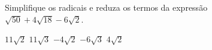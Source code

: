 Simplifique os radicais e reduza os termos da expressão\\$\sqrt{50}+4\sqrt{18}-6\sqrt{2}$.

$11\sqrt{2}$
$11\sqrt{3}$
$-4\sqrt{2}$
$-6\sqrt{3}$
$4\sqrt{2}$



